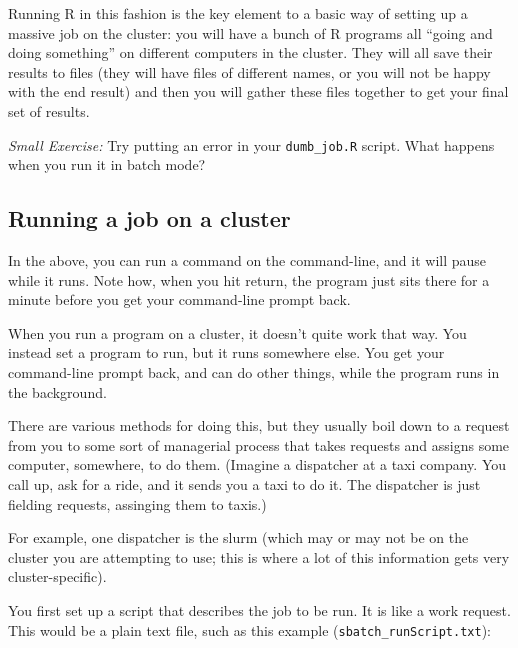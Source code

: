 \documentclass[
]{book}
\begin{document}
Running R in this fashion is the key element to a basic way of setting up a massive job on the cluster: you will have a bunch of R programs all ``going and doing something'' on different computers in the cluster.
They will all save their results to files (they will have files of different names, or you will not be happy with the end result) and then you will gather these files together to get your final set of results.

\emph{Small Exercise:} Try putting an error in your \texttt{dumb\_job.R} script. What happens when you run it in batch mode?

\hypertarget{running-a-job-on-a-cluster}{%
\subsection{Running a job on a cluster}\label{running-a-job-on-a-cluster}}

In the above, you can run a command on the command-line, and it will pause while it runs.
Note how, when you hit return, the program just sits there for a minute before you get your command-line prompt back.

When you run a program on a cluster, it doesn't quite work that way.
You instead set a program to run, but it runs somewhere else.
You get your command-line prompt back, and can do other things, while the program runs in the background.

There are various methods for doing this, but they usually boil down to a request from you to some sort of managerial process that takes requests and assigns some computer, somewhere, to do them.
(Imagine a dispatcher at a taxi company. You call up, ask for a ride, and it sends you a taxi to do it. The dispatcher is just fielding requests, assinging them to taxis.)

For example, one dispatcher is the slurm (which may or may not be on the cluster you are attempting to use; this is where a lot of this information gets very cluster-specific).

You first set up a script that describes the job to be run.
It is like a work request.
This would be a plain text file, such as this example (\texttt{sbatch\_runScript.txt}):
\end{document}
